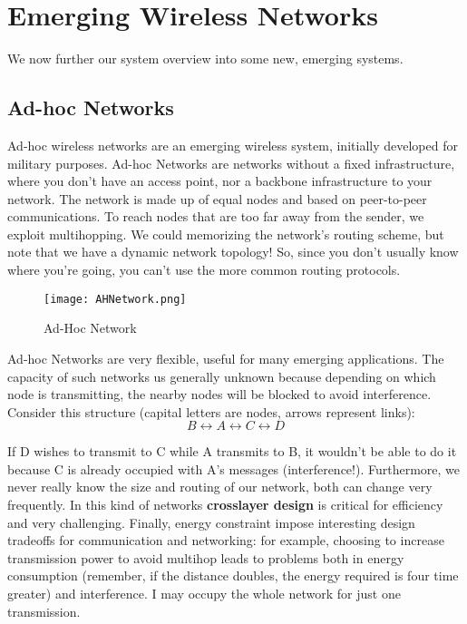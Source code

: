 \chapter{Emerging Wireless Networks}
We now further our system overview into some new, emerging systems.

\section{Ad-hoc Networks}
Ad-hoc wireless networks are an emerging wireless system, initially 
developed for military purposes. Ad-hoc Networks are networks without a fixed 
infrastructure, where you don't have an access point, nor a backbone 
infrastructure to your network. The network is made up of equal nodes and based 
on peer-to-peer communications. To reach nodes that are too far away from the 
sender, we exploit multihopping. We could memorizing the network's routing 
scheme, but note that we have a dynamic network topology! So, since you don't 
usually know where you're going, you can't use the more common routing 
protocols. 

\begin{figure}[t]
  \centering
  \texttt{[image: AHNetwork.png]}
  \caption{Ad-Hoc Network}				
  \label{fig:ewn:AHNetwork}
\end{figure}

Ad-hoc Networks are very flexible, useful for many emerging 
applications. The capacity of such networks us generally unknown because 
depending on which node is transmitting, the nearby nodes will be blocked to 
avoid interference. 
Consider this structure (capital letters are nodes, arrows represent 
links):
\begin{equation*}
B \leftrightarrow A \leftrightarrow C \leftrightarrow D
\end{equation*}

If D wishes to transmit to C while A transmits to B, it wouldn't be able 
to do it because C is already occupied with A's messages (interference!).
Furthermore, we never really know the size and routing of our network, 
both can change very frequently.
In this kind of networks \textbf{crosslayer design} is critical for efficiency 
and very challenging.
Finally, energy constraint impose interesting design tradeoffs for 
communication and networking: for example, choosing to increase transmission 
power to avoid multihop leads to problems both in energy consumption (remember, 
if the distance doubles, the energy required is four time greater) and
interference. I may occupy the whole network for just one transmission. 

